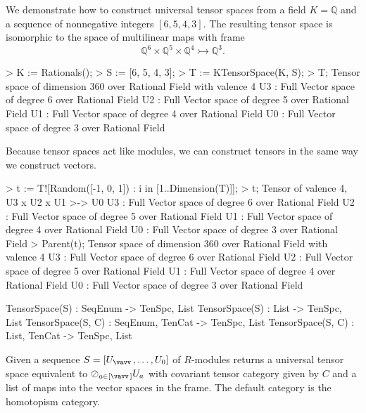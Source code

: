 \begin{example}[UniversalKTenSpc]

We demonstrate how to construct universal tensor spaces from a field $K=\mathbb{Q}$ and a sequence of nonnegative integers $[6,5,4,3]$. 
The resulting tensor space is isomorphic to the space of multilinear maps with frame 
\[ \mathbb{Q}^6\times \mathbb{Q}^5\times\mathbb{Q}^4\rightarrowtail\mathbb{Q}^3. \]
\begin{code}
> K := Rationals();
> S := [6, 5, 4, 3];
> T := KTensorSpace(K, S);
> T;
Tensor space of dimension 360 over Rational Field with valence 4
U3 : Full Vector space of degree 6 over Rational Field
U2 : Full Vector space of degree 5 over Rational Field
U1 : Full Vector space of degree 4 over Rational Field
U0 : Full Vector space of degree 3 over Rational Field
\end{code}

Because tensor spaces act like modules, we can construct tensors in the same way we construct vectors.
\begin{code}
> t := T![Random([-1, 0, 1]) : i in [1..Dimension(T)]];
> t;
Tensor of valence 4, U3 x U2 x U1 >-> U0
U3 : Full Vector space of degree 6 over Rational Field
U2 : Full Vector space of degree 5 over Rational Field
U1 : Full Vector space of degree 4 over Rational Field
U0 : Full Vector space of degree 3 over Rational Field
> Parent(t);
Tensor space of dimension 360 over Rational Field with valence 4
U3 : Full Vector space of degree 6 over Rational Field
U2 : Full Vector space of degree 5 over Rational Field
U1 : Full Vector space of degree 4 over Rational Field
U0 : Full Vector space of degree 3 over Rational Field
\end{code}
\end{example}


\begin{intrinsics}
TensorSpace(S) : SeqEnum -> TenSpc, List
TensorSpace(S) : List -> TenSpc, List
TensorSpace(S, C) : SeqEnum, TenCat -> TenSpc, List
TensorSpace(S, C) : List, TenCat -> TenSpc, List
\end{intrinsics}

Given a sequence $S=[U_{\vav},\dots, U_0]$ of $R$-modules returns a universal tensor 
space equivalent to $\rversor_{a\in[\vav]} U_a$ with covariant tensor 
category given by $C$ and a list of maps into the vector spaces in the frame. 
The default category is the homotopism category. 

